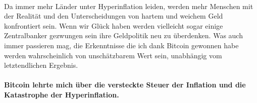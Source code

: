 \paragraph{}
Da immer mehr Länder unter Hyperinflation leiden, werden mehr Menschen mit der
Realität und den Unterscheidungen von hartem und weichem Geld konfrontiert sein.
Wenn wir Glück haben werden vielleicht sogar einige Zentralbanker gezwungen sein
ihre Geldpolitik neu zu überdenken. Was auch immer passieren mag, die
Erkenntnisse die ich dank Bitcoin gewonnen habe werden wahrscheinlich von
unschätzbarem Wert sein, unabhängig vom letztendlichen Ergebnis.

\paragraph{Bitcoin lehrte mich über die versteckte Steuer der Inflation und die
Katastrophe der Hyperinflation.}

%
%
%
%
%
